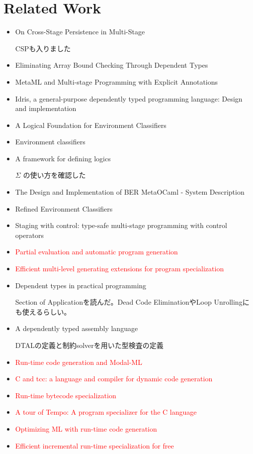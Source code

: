 \documentclass[runningheads]{llncs}
\newcommand{\red}[1]{\textcolor{red}{#1 }}
\begin{document}
\section{Related Work}

\begin{itemize}
   \item On Cross-Stage Persistence in Multi-Stage\cite{Hanada2014}

   CSPも入りました
   \item Eliminating Array Bound Checking Through Dependent Types\cite{Xi98}
   \item MetaML and Multi-stage Programming with Explicit Annotations\cite{MetaML}
   \item Idris, a general-purpose dependently typed programming language: Design and implementation\cite{brady2013idris}
   \item A Logical Foundation for Environment Classifiers\cite{Tsukada}
   \item Environment classifiers\cite{taha2003environment}
   \item A framework for defining logics\cite{harper1993framework}

    $\Sigma$ の使い方を確認した
   \item The Design and Implementation of {BER} MetaOCaml - System Description\cite{oleg2014}
   \item Refined Environment Classifiers\cite{kiselyov2016refined}
   \item Staging with control: type-safe multi-stage programming with control operators\cite{oishi2017staging}
   \item \red{Partial evaluation and automatic program generation}\cite{jones1993partial}
   \item \red{Efficient multi-level generating extensions for program specialization}\cite{gluck1995efficient}
   \item Dependent types in practical programming\cite{xi1999dependent}

        Section of Applicationを読んだ。Dead Code EliminationやLoop Unrollingにも使えるらしい。

   \item A dependently typed assembly language\cite{xi2001dependently}

   DTALの定義と制約solverを用いた型検査の定義
   \item \red{Run-time code generation and Modal-ML}\cite{wickline1998run}
   \item \red{C and tcc: a language and compiler for dynamic code generation}\cite{poletto1999c}
   \item \red{Run-time bytecode specialization}\cite{masuhara2001run}
   \item \red{A tour of Tempo: A program specializer for the C language}\cite{consel2004tour}
   \item \red{Optimizing ML with run-time code generation}\cite{lee1996optimizing}
   \item \red{Efficient incremental run-time specialization for free}\cite{marlet1999efficient}

\end{itemize}
\end{document}
